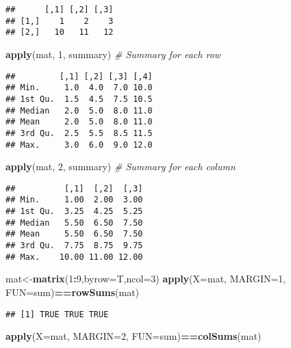 \documentclass[
]{article}
\newenvironment{Shaded}{\begin{snugshade}}{\end{snugshade}}
\newcommand{\AttributeTok}[1]{\textcolor[rgb]{0.13,0.29,0.53}{#1}}
\newcommand{\CommentTok}[1]{\textcolor[rgb]{0.56,0.35,0.01}{\textit{#1}}}
\newcommand{\DecValTok}[1]{\textcolor[rgb]{0.00,0.00,0.81}{#1}}
\newcommand{\FunctionTok}[1]{\textcolor[rgb]{0.13,0.29,0.53}{\textbf{#1}}}
\newcommand{\NormalTok}[1]{#1}
\newcommand{\OtherTok}[1]{\textcolor[rgb]{0.56,0.35,0.01}{#1}}
\newcommand{\SpecialCharTok}[1]{\textcolor[rgb]{0.81,0.36,0.00}{\textbf{#1}}}
\begin{document}
\begin{verbatim}
##      [,1] [,2] [,3]
## [1,]    1    2    3
## [2,]   10   11   12
\end{verbatim}

\begin{Shaded}
\begin{Highlighting}[]
\FunctionTok{apply}\NormalTok{(mat, }\DecValTok{1}\NormalTok{, summary) }\CommentTok{\# Summary for each row}
\end{Highlighting}
\end{Shaded}

\begin{verbatim}
##         [,1] [,2] [,3] [,4]
## Min.     1.0  4.0  7.0 10.0
## 1st Qu.  1.5  4.5  7.5 10.5
## Median   2.0  5.0  8.0 11.0
## Mean     2.0  5.0  8.0 11.0
## 3rd Qu.  2.5  5.5  8.5 11.5
## Max.     3.0  6.0  9.0 12.0
\end{verbatim}

\begin{Shaded}
\begin{Highlighting}[]
\FunctionTok{apply}\NormalTok{(mat, }\DecValTok{2}\NormalTok{, summary) }\CommentTok{\# Summary for each column}
\end{Highlighting}
\end{Shaded}

\begin{verbatim}
##          [,1]  [,2]  [,3]
## Min.     1.00  2.00  3.00
## 1st Qu.  3.25  4.25  5.25
## Median   5.50  6.50  7.50
## Mean     5.50  6.50  7.50
## 3rd Qu.  7.75  8.75  9.75
## Max.    10.00 11.00 12.00
\end{verbatim}

\begin{Shaded}
\begin{Highlighting}[]
\NormalTok{mat}\OtherTok{\textless{}{-}}\FunctionTok{matrix}\NormalTok{(}\DecValTok{1}\SpecialCharTok{:}\DecValTok{9}\NormalTok{,}\AttributeTok{byrow=}\NormalTok{T,}\AttributeTok{ncol=}\DecValTok{3}\NormalTok{)}
\FunctionTok{apply}\NormalTok{(}\AttributeTok{X=}\NormalTok{mat, }\AttributeTok{MARGIN=}\DecValTok{1}\NormalTok{, }\AttributeTok{FUN=}\NormalTok{sum)}\SpecialCharTok{==}\FunctionTok{rowSums}\NormalTok{(mat)}
\end{Highlighting}
\end{Shaded}

\begin{verbatim}
## [1] TRUE TRUE TRUE
\end{verbatim}

\begin{Shaded}
\begin{Highlighting}[]
\FunctionTok{apply}\NormalTok{(}\AttributeTok{X=}\NormalTok{mat, }\AttributeTok{MARGIN=}\DecValTok{2}\NormalTok{, }\AttributeTok{FUN=}\NormalTok{sum)}\SpecialCharTok{==}\FunctionTok{colSums}\NormalTok{(mat)}
\end{Highlighting}
\end{Shaded}
\end{document}
